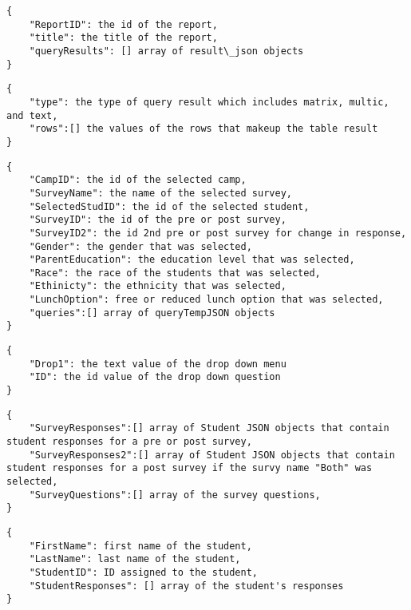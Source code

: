 \documentclass[../final.tex]{subfiles}
\begin{document}
	
\begin{lstlisting}[caption={report\_json }]
{
	"ReportID": the id of the report,
	"title": the title of the report,
	"queryResults": [] array of result\_json objects
}
\end{lstlisting}


\begin{lstlisting}[caption={result\_json}]
{
	"type": the type of query result which includes matrix, multic, and text,
	"rows":[] the values of the rows that makeup the table result
}
\end{lstlisting}


\begin{lstlisting}[caption={queryJSON}]
{
	"CampID": the id of the selected camp,
	"SurveyName": the name of the selected survey,
	"SelectedStudID": the id of the selected student,
	"SurveyID": the id of the pre or post survey,
	"SurveyID2": the id 2nd pre or post survey for change in response,
	"Gender": the gender that was selected,
	"ParentEducation": the education level that was selected,
	"Race": the race of the students that was selected,
	"Ethinicty": the ethnicity that was selected,
	"LunchOption": free or reduced lunch option that was selected,
	"queries":[] array of queryTempJSON objects
}
\end{lstlisting}

	
\begin{lstlisting}[caption={queryTempJSON}]
{
	"Drop1": the text value of the drop down menu
	"ID": the id value of the drop down question 
}
\end{lstlisting}

\begin{lstlisting}[caption={JSON Object Returned by ReportQuerying.php}]
{
	"SurveyResponses":[] array of Student JSON objects that contain student responses for a pre or post survey,
	"SurveyResponses2":[] array of Student JSON objects that contain student responses for a post survey if the survy name "Both" was selected,
	"SurveyQuestions":[] array of the survey questions,
}
\end{lstlisting}

\begin{lstlisting}[caption={Student JSON Object Used in ReportQuerying.php}]
{
	"FirstName": first name of the student,
	"LastName": last name of the student,
	"StudentID": ID assigned to the student,
	"StudentResponses": [] array of the student's responses
}

\end{lstlisting}


	
\end{document}
